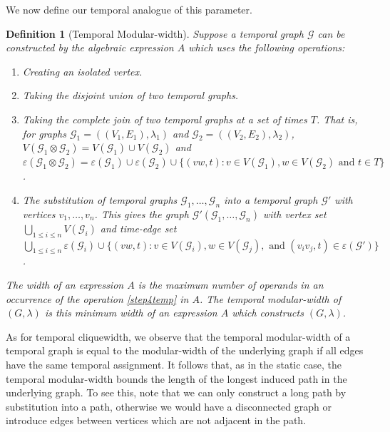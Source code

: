\documentclass[preprint,12pt]{elsarticle}
\newtheorem{definition}{Definition}
\begin{document}
We now define our temporal analogue of this parameter.

\begin{definition}[Temporal Modular-width]\label{def:temp-mw}
    Suppose a temporal graph $\mathcal{G}$ can be constructed by the algebraic expression $A$ which uses the following operations:
    \begin{enumerate}
        \item\label{step1temp} Creating an isolated vertex.
         \item\label{step2temp} Taking the disjoint union of two temporal graphs.
         \item\label{step3temp} Taking the complete join of two temporal graphs at a set of times $T$. That is, for graphs $\mathcal{G}_1=((V_1,E_1),\lambda_1)$ and $\mathcal{G}_2=((V_2,E_2),\lambda_2)$, $V(\mathcal{G}_1\otimes \mathcal{G}_2)=V(\mathcal{G}_1)\cup V(\mathcal{G}_2)$ and $\varepsilon(\mathcal{G}_1\otimes \mathcal{G}_2)=\varepsilon(\mathcal{G}_1)\cup \varepsilon(\mathcal{G}_2)\cup \{(vw,t):v\in V(\mathcal{G}_1), w\in V(\mathcal{G}_2)\text{ and } t\in T\}$.
        \item\label{step4temp} The substitution of temporal graphs $\mathcal{G}_1,\ldots, \mathcal{G}_n$ into a temporal graph $\mathcal{G}'$ with vertices $v_1,\ldots,v_n$. This gives the graph $\mathcal{G}'(\mathcal{G}_1,\ldots,\mathcal{G}_n)$ with vertex set $\bigcup_{1\leq i\leq n}V(\mathcal{G}_i)$ and time-edge set $\bigcup_{1\leq i\leq n}\varepsilon(\mathcal{G}_i)\cup \{(vw,t):v\in V(\mathcal{G}_i), w\in V(\mathcal{G}_j),\text{ and }(v_iv_j,t)\in \varepsilon(\mathcal{G}')\}$.
    \end{enumerate}
    The width of an expression $A$ is the maximum number of operands in an occurrence of the operation \ref{step4temp} in $A$. The \emph{temporal modular-width} of $(G,\lambda)$ is this minimum width of an expression $A$ which constructs $(G,\lambda)$.
\end{definition}

As for temporal cliquewidth, we observe that the temporal modular-width of a temporal graph is equal to the modular-width of the underlying graph if all edges have the same temporal assignment.  It follows that, as in the static case, the temporal modular-width bounds the length of the longest induced path in the underlying graph. To see this, note that we can only construct a long path by substitution into a path, otherwise we would have a disconnected graph or introduce edges between vertices which are not adjacent in the path.
\end{document}
